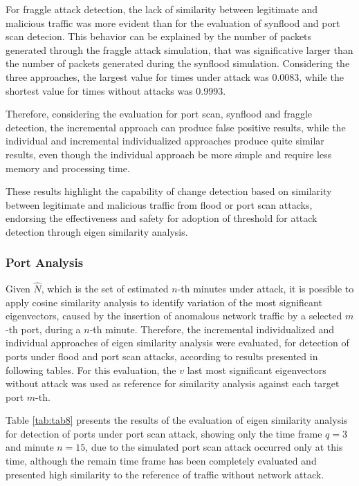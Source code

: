 \documentclass[review]{elsarticle}
\begin{document}
For fraggle attack detection, the lack of similarity between legitimate and malicious traffic was more evident than for the evaluation of synflood and port scan detecion. This behavior can be explained by the number of packets generated through the fraggle attack simulation, that was significative larger than the number of packets generated during the synflood simulation. Considering the three approaches, the largest value for times under attack was 0.0083, while the shortest value for times without attacks was 0.9993. 

Therefore, considering the evaluation for port scan, synflood and fraggle detection, the incremental approach can produce false positive results, while the individual and incremental individualized approaches produce quite similar results, even though the individual approach be more simple and require less memory and processing time.

These results highlight the capability of change detection based on similarity between legitimate and malicious traffic from flood or port scan attacks, endorsing the effectiveness and safety for adoption of threshold for attack detection through eigen similarity analysis.

\subsubsection{Port Analysis}
\label{sec:PortAnalysis}

Given $\hat{N}$, which is the set of estimated $n$-th minutes under attack, it is possible to apply cosine similarity analysis to identify variation of the most significant eigenvectors, caused by the insertion of anomalous network traffic by a selected $m$-th port, during a $n$-th minute. Therefore, the incremental individualized and individual approaches of eigen similarity analysis were evaluated, for detection of ports under flood and port scan attacks, according to results presented in following tables. For this evaluation, the $v$ last most significant eigenvectors without attack was used as reference for similarity analysis against each target port $m$-th.

Table \ref{tab:tab8} presents the results of the evaluation of eigen similarity analysis for detection of ports under port scan attack, showing only the time frame $q=3$ and minute $n=15$, due to the simulated port scan attack occurred only at this time, although the remain time frame has been completely evaluated and presented high similarity to the reference of traffic without network attack.
\end{document}

